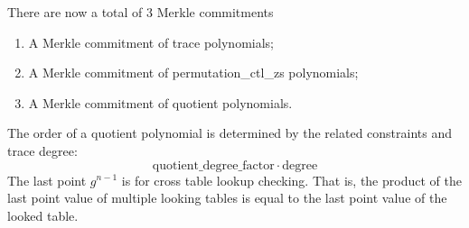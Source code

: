 \noindent There are now a total of 3 Merkle commitments

\begin{enumerate}
    \item A Merkle commitment of trace polynomials;
    \item A Merkle commitment of permutation\_ctl\_zs polynomials;
    \item A Merkle commitment of quotient polynomials.
\end{enumerate}

\noindent The order of a quotient polynomial is determined by the related constraints and trace degree: $$\mathrm{quotient\_degree\_factor} \cdot \mathrm{degree}$$ The last point $g^{n-1}$ is for cross table lookup checking. That is, the product of the last point value of multiple looking tables is equal to the last point value of the looked table.
